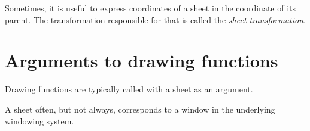Sometimes, it is useful to express coordinates of a sheet in the
coordinate of its parent.  The transformation responsible for that is
called the \emph{sheet transformation}.

\section{Arguments to drawing functions}

Drawing functions are typically called with a sheet as an argument.

A sheet often, but not always, corresponds to a window in the underlying
windowing system.
